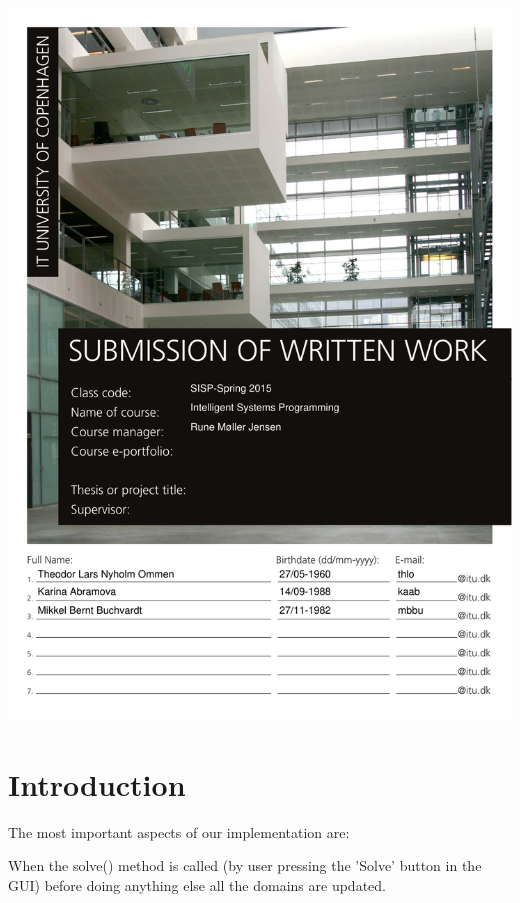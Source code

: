 




\includegraphics[scale=0.7]{./frontpage}

\begingroup
\let\flushleft
\let\endcenter\endflushleft
\maketitle
\endgroup

\section{Introduction}
The most important aspects of our implementation are:

When the solve() method is called (by user pressing the 'Solve' button in the GUI) before doing anything else all the domains are updated.

